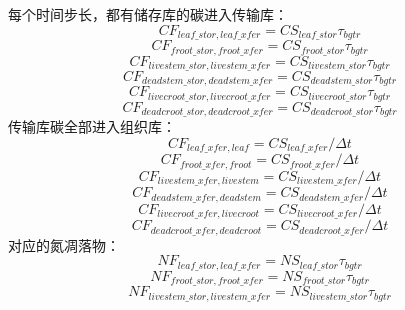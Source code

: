 每个时间步长，都有储存库的碳进入传输库：
\begin{equation}
CF_{leaf\_{stor},leaf\_{xfer}}=CS_{leaf\_{stor} } \tau_{bgtr}
\end{equation}
\begin{equation}
CF_{ {froot }\_{stor},{ froot }\_{xfer }}=CS_{{froot }\_{stor}} \tau_{bgtr}
\end{equation}
\begin{equation}
 CF_{livestem\_{stor},livestem\_{xfer}}=CS_{livestem\_{stor}}\tau_{bgtr}
\end{equation}
\begin{equation}
 CF_{deadstem\_{stor},deadstem\_{xfer}}=CS_{deadstem\_{stor}}\tau_{bgtr}
\end{equation}
\begin{equation}
  CF_{livecroot\_{stor},livecroot\_{xfer}}=CS_{livecroot\_{stor}}\tau_{bgtr}
\end{equation}
\begin{equation}
  CF_{deadcroot\_{stor},deadcroot\_{xfer}}=CS_{deadcroot\_{stor}}\tau_{bgtr}
\end{equation}
传输库碳全部进入组织库：
\begin{equation}
  CF_{leaf\_{xfer},leaf}=CS_{leaf\_{xfer}}/\Delta t
\end{equation}
\begin{equation}
  CF_{froot\_{xfer},froot}=CS_{froot\_{xfer}}/\Delta t
\end{equation}
\begin{equation}
  CF_{livestem\_{xfer},livestem}=CS_{livestem\_{xfer}}/\Delta t
\end{equation}
\begin{equation}
  CF_{deadstem\_{xfer},deadstem}=CS_{deadstem\_{xfer}}/\Delta t
\end{equation}
\begin{equation}
  CF_{livecroot\_{xfer},livecroot}=CS_{livecroot\_{xfer}}/\Delta t
\end{equation}
\begin{equation}
  CF_{deadcroot\_{xfer},deadcroot}=CS_{deadcroot\_{xfer}}/\Delta t
\end{equation}
对应的氮凋落物：
\begin{equation}
  NF_{leaf\_{stor},leaf\_{xfer}}=NS_{leaf\_{stor}}\tau_{bgtr}
\end{equation}
\begin{equation}
  NF_{froot\_{stor},froot\_{xfer}}=NS_{froot\_{stor}}\tau_{bgtr}
\end{equation}
\begin{equation}
  NF_{livestem\_{stor},livestem\_{xfer}}=NS_{livestem\_{stor}}\tau_{bgtr}
\end{equation}
